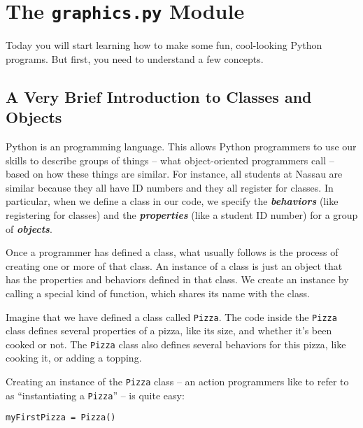 
\chapter{The \texttt{graphics.py} Module}
\label{day:graphics1}


\minitoc

Today you will start learning how to make some fun, cool-looking Python programs.  But first, you need to understand a few concepts.

\section{A Very Brief Introduction to Classes and Objects}

Python is an  programming language.  This allows Python programmers to use our skills to describe groups of things -- what object-oriented programmers call  -- based on how these things are similar.  For instance, all students at Nassau are similar because they all have ID numbers and they all register for classes.  In particular, when we define a class in our code, we specify the \textbf{\textit{behaviors}} (like registering for classes) and the \textbf{\textit{properties}} (like a student ID number) for a group of \textbf{\textit{objects}}.

Once a programmer has defined a class, what usually follows is the process of creating one or more  of that class.  An instance of a class is just an object that has the properties and behaviors defined in that class.  We create an instance by calling a special kind of function, which shares its name with the class.

Imagine that we have defined a class called \texttt{Pizza}.  The code inside the \texttt{Pizza} class defines several properties of a pizza, like its size, and whether it's been cooked or not.  The \texttt{Pizza} class also defines several behaviors for this pizza, like cooking it, or adding a topping.

Creating an instance of the \texttt{Pizza} class -- an action programmers like to refer to as ``instantiating a \texttt{Pizza}'' -- is quite easy:

\begin{verbatim}
myFirstPizza = Pizza()
\end{verbatim}

